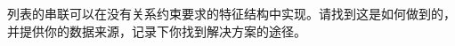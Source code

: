 {\begin{enumerate}

列表的串联可以在没有关系约束要求的特征结构中实现。请找到这是如何做到的，并提供你的数据来源，记录下你找到解决方案的途径。

\end{enumerate}
}


